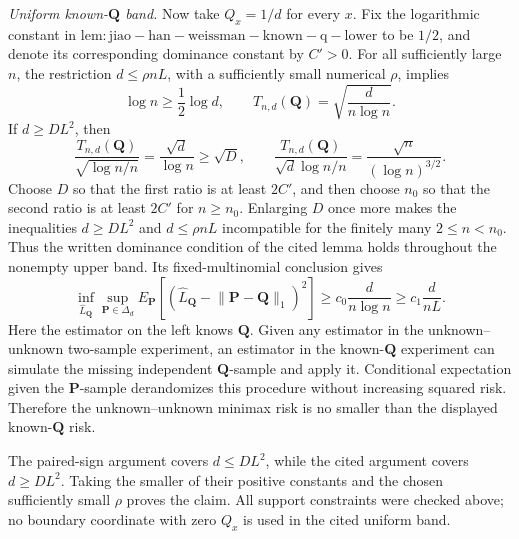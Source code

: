 \emph{Uniform known-\(\mathbf Q\) band.}
Now take \(Q_x=1/d\) for every \(x\).  Fix the logarithmic constant in \(\mathrm{lem:jiao-han-weissman-known-q-lower}\) to be \(1/2\), and denote its corresponding dominance constant by \(C'>0\).  For all sufficiently large \(n\), the restriction \(d\leq\rho nL\), with a sufficiently small numerical \(\rho\), implies
\[
 \log n\geq\frac12\log d,
 \qquad
 T_{n,d}(\mathbf Q)=\sqrt{\frac{d}{n\log n}}.
\]
If \(d\geq DL^2\), then
\[
 \frac{T_{n,d}(\mathbf Q)}{\sqrt{\log n/n}}
 =\frac{\sqrt d}{\log n}
 \geq\sqrt D,
 \qquad
 \frac{T_{n,d}(\mathbf Q)}{\sqrt d\log n/n}
 =\frac{\sqrt n}{(\log n)^{3/2}}.
\]
Choose \(D\) so that the first ratio is at least \(2C'\), and then choose \(n_0\) so that the second ratio is at least \(2C'\) for \(n\geq n_0\).  Enlarging \(D\) once more makes the inequalities \(d\geq DL^2\) and \(d\leq\rho nL\) incompatible for the finitely many \(2\leq n<n_0\).  Thus the written dominance condition of the cited lemma holds throughout the nonempty upper band.  Its fixed-multinomial conclusion gives
\[
 \inf_{\widehat L_{\mathbf Q}}
 \sup_{\mathbf P\in\Delta_d}
 E_{\mathbf P}\!\left[
   (\widehat L_{\mathbf Q}-\lVert\mathbf P-\mathbf Q\rVert_1)^2
 \right]
 \geq c_0\frac{d}{n\log n}
 \geq c_1\frac{d}{nL}.
\]
Here the estimator on the left knows \(\mathbf Q\).  Given any estimator in the unknown--unknown two-sample experiment, an estimator in the known-\(\mathbf Q\) experiment can simulate the missing independent \(\mathbf Q\)-sample and apply it.  Conditional expectation given the \(\mathbf P\)-sample derandomizes this procedure without increasing squared risk.  Therefore the unknown--unknown minimax risk is no smaller than the displayed known-\(\mathbf Q\) risk.

The paired-sign argument covers \(d\leq DL^2\), while the cited argument covers \(d\geq DL^2\).  Taking the smaller of their positive constants and the chosen sufficiently small \(\rho\) proves the claim.  All support constraints were checked above; no boundary coordinate with zero \(Q_x\) is used in the cited uniform band.